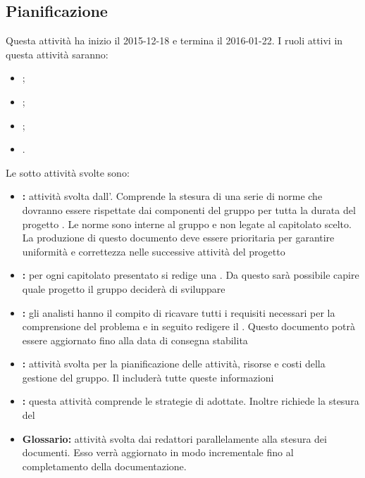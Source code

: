 \documentclass[12pt,a4paper]{article}
\begin{document}
\subsection{Pianificazione} %
Questa attività ha inizio il 2015-12-18 e termina il 2016-01-22. I ruoli attivi in questa attività saranno:
\begin{itemize}
	\item \PM;
	\item \AM;
	\item \AN;
	\item \VR.
\end{itemize}
Le sotto attività svolte sono:
\begin{itemize}
	\item \textbf{\NdP:} attività svolta dall’\AM. Comprende la stesura di una serie di norme che dovranno essere rispettate dai componenti del gruppo per tutta la durata del progetto \prjL. Le norme sono interne al gruppo e non legate al capitolato scelto. La produzione di questo documento deve essere prioritaria per garantire uniformità e correttezza nelle successive attività del progetto
	\item \textbf{\SdF:} per ogni capitolato presentato si redige una \SdF. Da questo sarà possibile capire quale progetto il gruppo deciderà di sviluppare
	\item \textbf{\AdR:} gli analisti hanno il compito di ricavare tutti i requisiti necessari per la comprensione del problema e in seguito redigere il \AdR. Questo documento potrà essere aggiornato fino alla data di consegna stabilita
	\item \textbf{\PdP:} attività svolta per la pianificazione delle attività, risorse e costi della gestione del gruppo. Il \PdP{} includerà tutte queste informazioni
	\item \textbf{\PdQ:} questa attività comprende le strategie di \FVV adottate. Inoltre richiede la stesura del \PdQ
	\item \textbf{Glossario:} attività svolta dai redattori parallelamente alla stesura dei documenti. Esso verrà aggiornato in modo incrementale fino al completamento della documentazione.
\end{itemize}
\end{document}
